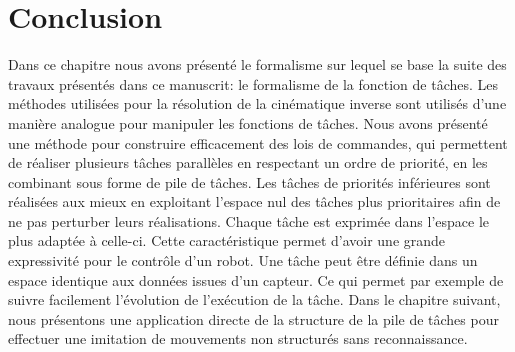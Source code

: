 \section*{Conclusion}

Dans ce chapitre nous avons présenté le formalisme sur lequel
se base la suite des travaux présentés dans ce manuscrit: le formalisme de la fonction de 
t\^aches. Les méthodes utilisées pour la résolution de la cinématique inverse
sont utilisés d'une manière analogue pour manipuler les fonctions de t\^aches.
Nous avons présenté une méthode pour construire efficacement des lois de commandes,
qui permettent de réaliser plusieurs t\^aches parallèles en
respectant un ordre de priorité, en les combinant sous
forme de pile de t\^aches. Les t\^aches de priorités inférieures
sont réalisées aux mieux en exploitant l'espace nul des t\^aches
plus prioritaires afin de ne pas perturber leurs réalisations.
Chaque t\^ache est exprimée dans l'espace le plus adaptée à celle-ci.
Cette caractéristique permet d'avoir une grande expressivité
pour le contr\^ole d'un robot.
Une t\^ache peut \^etre définie dans un espace identique
aux données issues d'un capteur. Ce qui permet par exemple de suivre
facilement l'évolution de l'exécution de la t\^ache.
Dans le chapitre suivant, nous présentons une application directe
de la structure de la pile de t\^aches pour effectuer
une imitation de mouvements non structurés sans reconnaissance.


